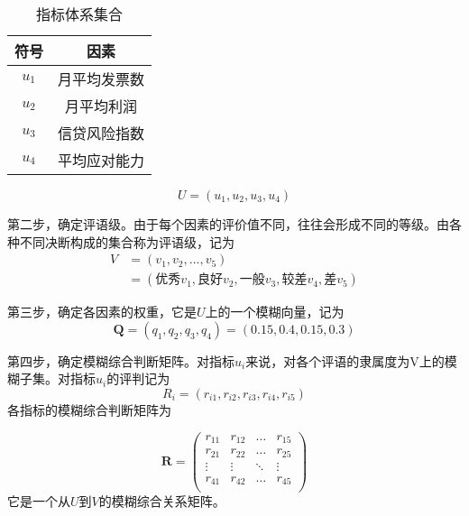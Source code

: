 \documentclass{cumcmthesis}
\begin{document}
\begin{table}[H]   %
	\caption{指标体系集合}	\centering
	\begin{tabular}{cc}
		\toprule[1.5pt]
		符号 & 因素\\
		\midrule[1pt]
		$u_1$ & 月平均发票数\\
		$u_2$ & 月平均利润\\
		$u_3$ & 信贷风险指数\\
		$u_4$ & 平均应对能力\\
		\bottomrule[1.5pt]
	\end{tabular}
\end{table}	

\begin{equation}
U=(u_1,u_2,u_3,u_4)
\end{equation}

第二步，确定评语级。由于每个因素的评价值不同，往往会形成不同的等级。由各种不同决断构成的集合称为评语级，记为
\begin{align}
V & =(v_1,v_2,...,v_5)\\
  & =(\mbox{优秀}v_1,\mbox{良好}v_2,\mbox{一般}v_3,\mbox{较差}v_4,\mbox{差}v_5)
\end{align}

第三步，确定各因素的权重，它是$U$上的一个模糊向量，记为
\begin{equation}
\mathbf{Q}=(q_1,q_2,q_3,q_4)=(0.15,0.4,0.15,0.3)
\end{equation}

第四步，确定模糊综合判断矩阵。对指标$u_i$来说，对各个评语的隶属度为V上的模糊子集。对指标$u_i$的评判记为
\begin{equation}
R_i=(r_{i1},r_{i2},r_{i3},r_{i4},r_{i5})
\end{equation}
各指标的模糊综合判断矩阵为

\[
\mathbf{R} = \left(
\begin{array}{cccc}
r_{11} & r_{12} & \ldots & r_{15}\\
r_{21} & r_{22} & \ldots & r_{25}\\
\vdots & \vdots & \ddots & \vdots\\
r_{41} & r_{42} & \ldots & r_{45}\\
\end{array} \right)
\]
它是一个从$U$到$V$的模糊综合关系矩阵。
\end{document}
